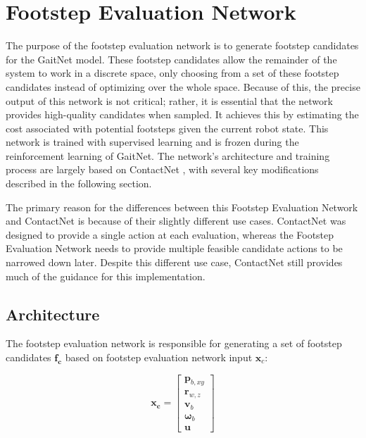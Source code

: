 \section{Footstep Evaluation Network}
\label{sec:methodology-footstep-evaluation-network}

The purpose of the footstep evaluation network is to generate
footstep candidates for the GaitNet model. These footstep candidates
allow the remainder of the system to work in a discrete space, only
choosing from a set of these footstep candidates instead of
optimizing over the whole space. Because of this, the precise output
of this network is not critical; rather, it is essential that the
network provides high-quality candidates when sampled. It achieves
this by estimating the cost associated with potential footsteps given
the current robot state. This network is trained with supervised
learning and is frozen during the reinforcement learning of GaitNet.
The network's architecture and training process are largely based on
ContactNet \cite{bratta_contactnet_2024}, with several key
modifications described in the following section.

The primary reason for the differences between this Footstep
Evaluation Network and ContactNet \cite{bratta_contactnet_2024} is
because of their slightly different use cases. ContactNet was
designed to provide a single action at each evaluation, whereas the
Footstep Evaluation Network needs to provide multiple feasible
candidate actions to be narrowed down later. Despite this different
use case, ContactNet still provides much of the guidance for this
implementation.

\subsection{Architecture}
\label{subsec:methodology-contactnet-architecture}

The footstep evaluation network is responsible for generating a set
of footstep candidates $\mathbf{f_c}$ based on footstep evaluation
network input $\mathbf x_c$:

\begin{equation}
  \mathbf{x_c} =
  \begin{bmatrix}
    \mathbf p_{b,xy} \\
    \mathbf r_{w,z} \\
    \mathbf v_b \\
    \mathbf \omega_b \\
    \mathbf u
  \end{bmatrix}
  \label{eq:contactnet-x}
\end{equation}

